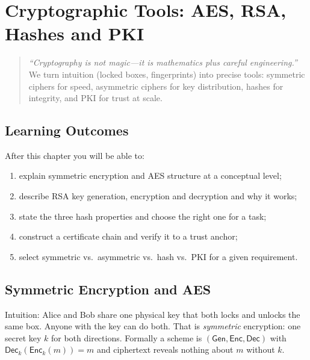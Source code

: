 \chapter{Cryptographic Tools: AES, RSA, Hashes and PKI}
\label{ch:crypto}

\begin{quote}
\emph{``Cryptography is not magic---it is mathematics plus careful engineering.''} We turn intuition (locked boxes, fingerprints) into precise tools: symmetric ciphers for speed, asymmetric ciphers for key distribution, hashes for integrity, and PKI for trust at scale.
\end{quote}

\noindent{}
\vspace{0.4em}

\section*{Learning Outcomes}
After this chapter you will be able to:
\begin{enumerate}[label=(L\arabic*)]
    \item explain symmetric encryption and AES structure at a conceptual level;
    \item describe RSA key generation, encryption and decryption and why it works;
    \item state the three hash properties and choose the right one for a task;
    \item construct a certificate chain and verify it to a trust anchor;
    \item select symmetric vs.\ asymmetric vs.\ hash vs.\ PKI for a given requirement.
\end{enumerate}

\section{Symmetric Encryption and AES}
\label{sec:symmetric}
Intuition: Alice and Bob share one physical key that both locks and unlocks the same box. Anyone with the key can do both. That is \emph{symmetric} encryption: one secret key $k$ for both directions. Formally a scheme is $(\mathsf{Gen},\mathsf{Enc},\mathsf{Dec})$ with $\mathsf{Dec}_k(\mathsf{Enc}_k(m))=m$ and ciphertext reveals nothing about $m$ without $k$.

